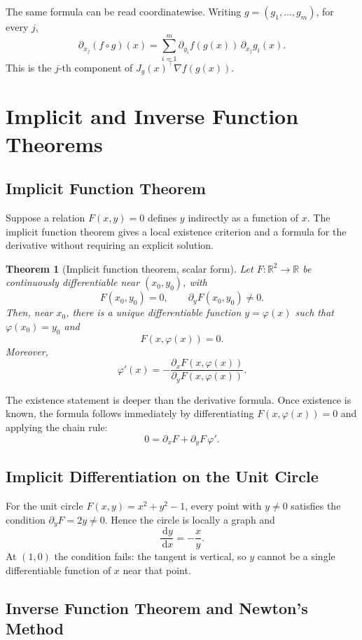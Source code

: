 \documentclass[11pt]{article}
\newcommand{\R}{\mathbb{R}}
\newcommand{\dd}{\,\mathrm{d}}
\theoremstyle{definition}
\theoremstyle{plain}
\newtheorem{theorem}[definition]{Theorem}
\theoremstyle{remark}
\begin{document}
The same formula can be read coordinatewise. Writing
$g=(g_1,\ldots,g_m)$, for every $j$,
\[
\boxed{
\partial_{x_j}(f\circ g)(x)
=\sum_{i=1}^m
\partial_{y_i}f(g(x))\,\partial_{x_j}g_i(x).}
\]
This is the $j$-th component of
$J_g(x)^\top\nabla f(g(x))$.

\section{Implicit and Inverse Function Theorems}

\subsection{Implicit Function Theorem}

Suppose a relation $F(x,y)=0$ defines $y$ indirectly as a function of $x$.
The implicit function theorem gives a local existence criterion and a formula
for the derivative without requiring an explicit solution.

\begin{theorem}[Implicit function theorem, scalar form]
Let $F:\R^2\to\R$ be continuously differentiable near $(x_0,y_0)$, with
\[
F(x_0,y_0)=0,
\qquad
\partial_yF(x_0,y_0)\neq0.
\]
Then, near $x_0$, there is a unique differentiable function $y=\varphi(x)$
such that $\varphi(x_0)=y_0$ and
\[
F(x,\varphi(x))=0.
\]
Moreover,
\[
\boxed{\varphi'(x)=-\frac{\partial_xF(x,\varphi(x))}
{\partial_yF(x,\varphi(x))}}.
\]
\end{theorem}

The existence statement is deeper than the derivative formula. Once existence
is known, the formula follows immediately by differentiating
$F(x,\varphi(x))=0$ and applying the chain rule:
\[
0=\partial_xF+\partial_yF\,\varphi'.
\]

\subsection{Implicit Differentiation on the Unit Circle}

For the unit circle $F(x,y)=x^2+y^2-1$, every point with $y\neq0$ satisfies
the condition $\partial_yF=2y\neq0$. Hence the circle is locally a graph and
\[
\frac{\dd y}{\dd x}=-\frac{x}{y}.
\]
At $(1,0)$ the condition fails: the tangent is vertical, so $y$ cannot be a
single differentiable function of $x$ near that point.

\subsection{Inverse Function Theorem and Newton's Method}
\end{document}
